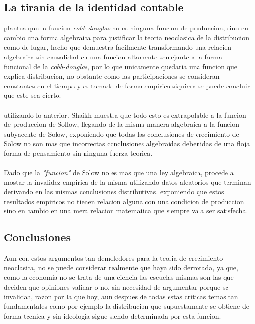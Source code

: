 \documentclass[11pt]{article}
\begin{document}
\begin{flushleft}
    \subsection{La tirania de la identidad contable}
    \citet{shaikh_1974} plantea que la funcion \textit{cobb-douglas} no es ninguna funcion de produccion, 
    sino en cambio una forma algebraica para justificar la teoria neoclasica de la distribucion como de lugar,
    hecho que demuestra facilmente transformando una relacion algebraica sin causalidad en una funcion altamente
    semejante a la forma funcional de la \textit{cobb-douglas}, por lo que unicamente quedaria
    una funcion que explica distribucion, no obstante como las participaciones se consideran
    constantes en el tiempo y es tomado de forma empirica siquiera se puede concluir que esto sea cierto.
    \\~\\
    utilizando lo anterior, Shaikh muestra que todo esto es extrapolable a la funcion de produccion de Sollow,
    llegando de la misma manera algebraica a la funcion subyacente de Solow, exponiendo que todas las conclusiones
    de crecimiento de Solow no son mas que incorrectas conclusiones algebraidas debenidas de una floja forma de pensamiento sin ninguna fuerza teorica.
    \\~\\
    Dado que la \textit{"funcion"} de Solow no es mas que una ley algebraica, procede a mostar la invalidez empirica de la misma utilizando datos aleatorios
    que terminan derivando en las mismas conclusiones distributivas. exponiendo que estos resultados empiricos no tienen relacion alguna con 
    una condicion de produccion sino en cambio en una mera relacion matematica que siempre va a ser satisfecha.
    
    \subsection{Conclusiones}

    Aun con estos argumentos tan demoledores para la teoria de crecimiento neoclasica, no se puede considerar
    realmente que haya sido derrotada, ya que, como la economia no se trata de una ciencia las escuelas mismas
    son las que deciden que opiniones validar o no, sin necesidad de argumentar porque se invalidan, razon por la que hoy,
    aun despues de todas estas criticas temas tan fundamentales como por ejemplo la distribucion que supuestamente se obtiene de forma tecnica y sin ideologia
    sigue siendo determinada por esta funcion.
    


\end{flushleft}
\end{document}
